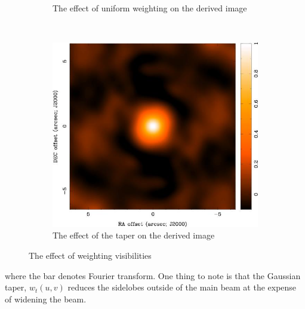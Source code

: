 \begin{figure}[h]
\begin{subfigure}[b]{0.3\textwidth}
                \caption{The effect of uniform weighting on the derived image}
                \label{fig:UniformWeight}
        \end{subfigure}
        ~ %
           \begin{subfigure}[b]{0.3\textwidth}
                \includegraphics[width=\textwidth]{Figures/taper}
                \caption{The effect of the taper on the derived image\\ \hspace{10pt}}
                \label{fig:taper}
        \end{subfigure}
     
        \caption[The effect of weighting visibilities]{The effect of weighting visibilities~\citep[Slide 43,44,46]{wilner.siw2014}}\label{fig:weighting}
\end{figure}

where the bar denotes Fourier transform. One thing to note is that the Gaussian taper, $w_t(u,v)$ reduces the sidelobes outside of the main beam at the expense of widening the beam. 
